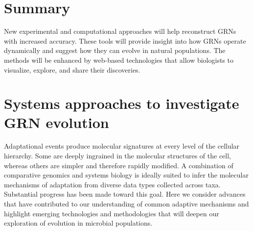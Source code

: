 \section{Summary}

New experimental and computational approaches will help reconstruct GRNs with increased accuracy. These tools will provide insight into how GRNs operate dynamically and suggest how they can evolve in natural populations. The methods will be enhanced by web-based technologies that allow biologists to visualize, explore, and share their discoveries.

\section{Systems approaches to investigate GRN evolution}

Adaptational events produce molecular signatures at every level of the cellular hierarchy.  Some are deeply ingrained in the molecular structures of the cell, whereas others are simpler and therefore rapidly modified.  A combination of comparative genomics and systems biology is ideally suited to infer the molecular mechanisms of adaptation from diverse data types collected across taxa. Substantial progress has been made toward this goal. Here we consider advances that have contributed to our understanding of common adaptive mechanisms and highlight emerging technologies and methodologies that will deepen our exploration of evolution in microbial populations.  

